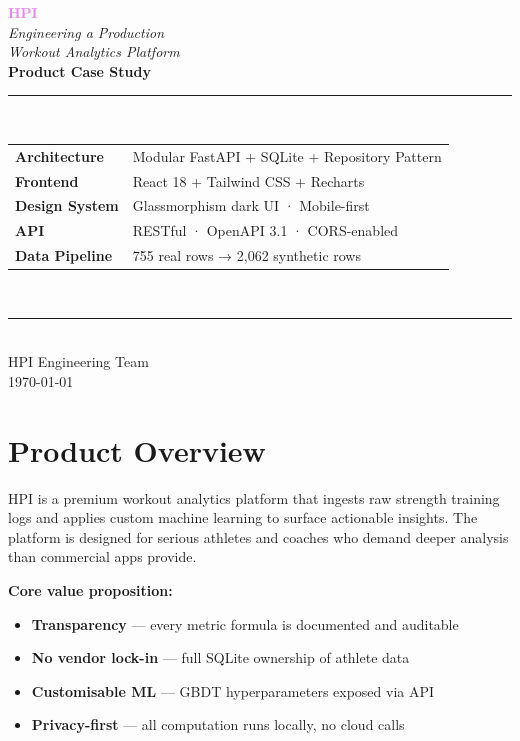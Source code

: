 \documentclass[12pt,a4paper]{report}
\begin{document}
\begin{titlepage}
  \centering
  \vspace*{2cm}
  {\Huge\bfseries\textcolor{violet}{HPI}}\\[0.5em]
  {\Large\textit{Engineering a Production}}\\
  {\Large\textit{Workout Analytics Platform}}\\[3cm]

  {\LARGE\bfseries Product Case Study}\\[1cm]
  \rule{0.6\textwidth}{0.4pt}\\[1cm]

  \begin{tabular}{ll}
    \textbf{Architecture}  & Modular FastAPI + SQLite + Repository Pattern \\
    \textbf{Frontend}      & React 18 + Tailwind CSS + Recharts \\
    \textbf{Design System} & Glassmorphism dark UI · Mobile-first \\
    \textbf{API}           & RESTful · OpenAPI 3.1 · CORS-enabled \\
    \textbf{Data Pipeline} & 755 real rows → 2{,}062 synthetic rows \\
  \end{tabular}\\[3cm]

  \rule{0.6\textwidth}{0.4pt}\\[0.5em]
  {\large HPI Engineering Team}\\
  {\normalsize\today}
  \vfill
\end{titlepage}

\tableofcontents
\newpage

\chapter*{Product Overview}

HPI is a premium workout analytics platform that ingests raw strength
training logs and applies custom machine learning to surface actionable insights.
The platform is designed for serious athletes and coaches who demand deeper
analysis than commercial apps provide.

\textbf{Core value proposition:}
\begin{itemize}
  \item \textbf{Transparency} — every metric formula is documented and auditable
  \item \textbf{No vendor lock-in} — full SQLite ownership of athlete data
  \item \textbf{Customisable ML} — GBDT hyperparameters exposed via API
  \item \textbf{Privacy-first} — all computation runs locally, no cloud calls
\end{itemize}
\end{document}
